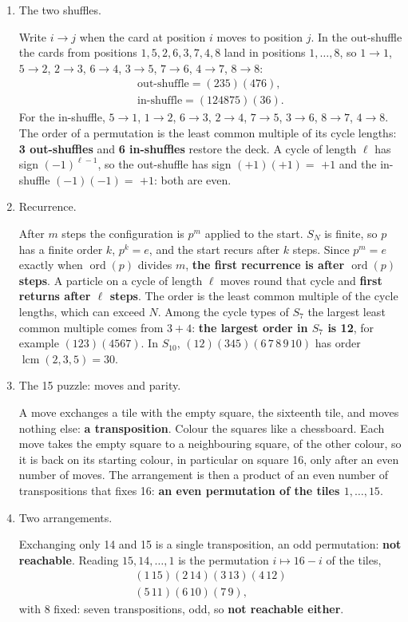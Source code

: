 \documentclass[11pt,a4paper]{article}
\DeclareMathOperator{\ord}{ord}
\DeclareMathOperator{\lcm}{lcm}
\newcommand{\prob}[1]{\par\vspace{1.1em}\noindent{\bfseries\large #1}\par\vspace{0.1em}}
\newenvironment{parts}{\begin{enumerate}[label=\textbf{(\alph*)},leftmargin=2.2em,itemsep=0.6em,topsep=0.2em]}{\end{enumerate}}
\newcommand{\pq}[1]{\item {\color{black!60}#1}\par}
\newcommand{\ans}[1]{{\boldmath\bfseries #1}}
\begin{document}
\prob{4. Shuffles, recurrence and the 15 puzzle}
\begin{parts}
\pq{The two shuffles.}
Write $i \to j$ when the card at position $i$ moves to position $j$. In the out-shuffle the cards from positions $1, 5, 2, 6, 3, 7, 4, 8$ land in positions $1, \dots, 8$, so $1 \to 1$, $5 \to 2$, $2 \to 3$, $6 \to 4$, $3 \to 5$, $7 \to 6$, $4 \to 7$, $8 \to 8$:
\[
  \begin{gathered}
  \text{out-shuffle} = (235)(476), \\
  \text{in-shuffle} = (124875)(36).
  \end{gathered}
\]
For the in-shuffle, $5 \to 1$, $1 \to 2$, $6 \to 3$, $2 \to 4$, $7 \to 5$, $3 \to 6$, $8 \to 7$, $4 \to 8$. The order of a permutation is the least common multiple of its cycle lengths: \ans{3 out-shuffles} and \ans{6 in-shuffles} restore the deck. A cycle of length $\ell$ has sign $(-1)^{\ell - 1}$, so the out-shuffle has sign $(+1)(+1) = $ \ans{$+1$} and the in-shuffle $(-1)(-1) = $ \ans{$+1$}: both are even.

\pq{Recurrence.}
After $m$ steps the configuration is $p^m$ applied to the start. $S_N$ is finite, so $p$ has a finite order $k$, $p^k = e$, and the start recurs after $k$ steps. Since $p^m = e$ exactly when $\ord(p)$ divides $m$, \ans{the first recurrence is after $\ord(p)$ steps}. A particle on a cycle of length $\ell$ moves round that cycle and \ans{first returns after $\ell$ steps}. The order is the least common multiple of the cycle lengths, which can exceed $N$. Among the cycle types of $S_7$ the largest least common multiple comes from $3 + 4$: \ans{the largest order in $S_7$ is 12}, for example $(123)(4567)$. In $S_{10}$, \ans{$(12)(345)(6\,7\,8\,9\,10)$} has order $\lcm(2, 3, 5) = 30$.

\pq{The 15 puzzle: moves and parity.}
A move exchanges a tile with the empty square, the sixteenth tile, and moves nothing else: \ans{a transposition}. Colour the squares like a chessboard. Each move takes the empty square to a neighbouring square, of the other colour, so it is back on its starting colour, in particular on square 16, only after an even number of moves. The arrangement is then a product of an even number of transpositions that fixes 16: \ans{an even permutation of the tiles $1, \dots, 15$}.

\pq{Two arrangements.}
Exchanging only 14 and 15 is a single transposition, an odd permutation: \ans{not reachable}. Reading $15, 14, \dots, 1$ is the permutation $i \mapsto 16 - i$ of the tiles,
\[
  \begin{gathered}
  (1\,15)(2\,14)(3\,13)(4\,12) \\
  (5\,11)(6\,10)(7\,9),
  \end{gathered}
\]
with 8 fixed: seven transpositions, odd, so \ans{not reachable either}.
\end{parts}
\end{document}
